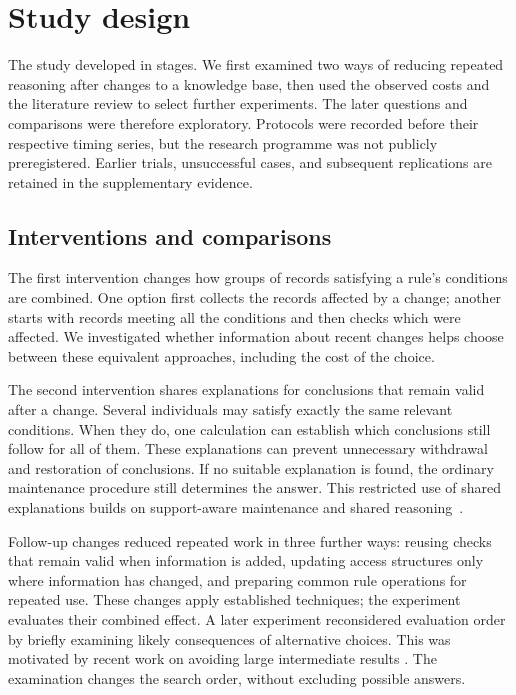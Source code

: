 \section{Study design}
\label{sec:methods}
The study developed in stages. We first examined two ways of reducing repeated
reasoning after changes to a knowledge base, then used the observed costs and
the literature review to select further experiments. The later questions and
comparisons were therefore exploratory. Protocols were recorded before their
respective timing series, but the research programme was not publicly
preregistered. Earlier trials, unsuccessful cases, and subsequent replications
are retained in the supplementary evidence.

\subsection{Interventions and comparisons}
The first intervention changes how groups of records satisfying a rule's
conditions are combined. One option first collects the records affected by a
change; another starts with records meeting all the conditions and then checks
which were affected. We investigated whether information about recent changes
helps choose between these equivalent approaches, including the cost of the choice.

The second intervention shares explanations for conclusions that remain valid
after a change. Several individuals may satisfy exactly the same relevant
conditions. When they do, one calculation can establish which conclusions
still follow for all of them. These explanations can prevent unnecessary
withdrawal and restoration of conclusions. If no suitable explanation is
found, the ordinary maintenance procedure still determines the answer. This
restricted use of shared explanations builds on support-aware maintenance and
shared reasoning~\cite{motik2015bf,hu2018,hu2019compressed,hu2022modular}.

Follow-up changes reduced repeated work in three further ways: reusing checks
that remain valid when information is added, updating access structures only
where information has changed, and preparing common rule operations for
repeated use. These changes apply established techniques; the experiment
evaluates their combined effect. A later experiment reconsidered evaluation
order by briefly examining likely consequences of alternative choices. This
was motivated by recent work on avoiding large intermediate results
\cite{qiao2026,bekkers2025}. The examination changes the search order, without
excluding possible answers.

